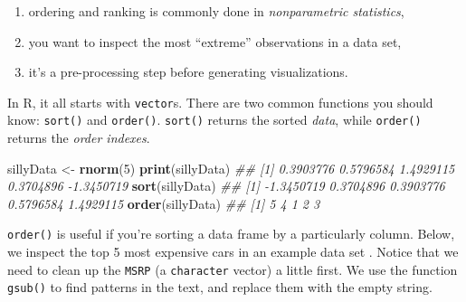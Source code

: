 \documentclass[12pt,krantz2]{krantz}
\makeatletter
\newenvironment{Shaded}{\begin{snugshade}}{\end{snugshade}}
\newcommand{\CommentTok}[1]{\textcolor[rgb]{0.37,0.37,0.37}{\textit{#1}}}
\newcommand{\DataTypeTok}[1]{\textcolor[rgb]{0.27,0.27,0.27}{#1}}
\newcommand{\DecValTok}[1]{\textcolor[rgb]{0.06,0.06,0.06}{#1}}
\newcommand{\KeywordTok}[1]{\textcolor[rgb]{0.27,0.27,0.27}{\textbf{#1}}}
\newcommand{\NormalTok}[1]{#1}
\newcommand{\OperatorTok}[1]{\textcolor[rgb]{0.43,0.43,0.43}{\textbf{#1}}}
\newcommand{\OtherTok}[1]{\textcolor[rgb]{0.37,0.37,0.37}{#1}}
\newcommand{\StringTok}[1]{\textcolor[rgb]{0.5,0.5,0.5}{#1}}
\providecommand{\tightlist}{%
  \setlength{\itemsep}{0pt}\setlength{\parskip}{0pt}}
\newenvironment{kframe}{%
\medskip{}
\setlength{\fboxsep}{.8em}
 \def\at@end@of@kframe{}%
 \ifinner\ifhmode%
  \def\at@end@of@kframe{\end{minipage}}%
  \begin{minipage}{\columnwidth}%
 \fi\fi%
 \def\FrameCommand##1{\hskip\@totalleftmargin \hskip-\fboxsep
 \colorbox{shadecolor}{##1}\hskip-\fboxsep
     \hskip-\linewidth \hskip-\@totalleftmargin \hskip\columnwidth}%
 \MakeFramed {\advance\hsize-\width
   \@totalleftmargin\z@ \linewidth\hsize
   \@setminipage}}%
 {\par\unskip\endMakeFramed%
 \at@end@of@kframe}
\renewenvironment{Shaded}{\begin{kframe}}{\end{kframe}}
\makeatother
\begin{document}
\begin{enumerate}
\def\labelenumi{\arabic{enumi}.}
\tightlist
\item
  ordering and ranking is commonly done in \emph{nonparametric statistics},
\item
  you want to inspect the most ``extreme'' observations in a data set,
\item
  it's a pre-processing step before generating visualizations.
\end{enumerate}

In R, it all starts with \texttt{vector}s. There are two common functions you should know: \texttt{sort()} and \texttt{order()}. \texttt{sort()} returns the sorted \emph{data}, while \texttt{order()} returns the \emph{order indexes}.

\begin{Shaded}
\begin{Highlighting}[]
\NormalTok{sillyData <-}\StringTok{ }\KeywordTok{rnorm}\NormalTok{(}\DecValTok{5}\NormalTok{)}
\KeywordTok{print}\NormalTok{(sillyData)}
\CommentTok{## [1]  0.3903776  0.5796584  1.4929115  0.3704896 -1.3450719}
\KeywordTok{sort}\NormalTok{(sillyData)}
\CommentTok{## [1] -1.3450719  0.3704896  0.3903776  0.5796584  1.4929115}
\KeywordTok{order}\NormalTok{(sillyData)}
\CommentTok{## [1] 5 4 1 2 3}
\end{Highlighting}
\end{Shaded}

\texttt{order()} is useful if you're sorting a data frame by a particularly column. Below, we inspect the top 5 most expensive cars in an example data set \citep{sas_cars}. Notice that we need to clean up the \texttt{MSRP} (a \texttt{character} vector) a little first. We use the function \texttt{gsub()} to find patterns in the text, and replace them with the empty string.

\begin{Shaded}
\end{Shaded}
\end{document}
